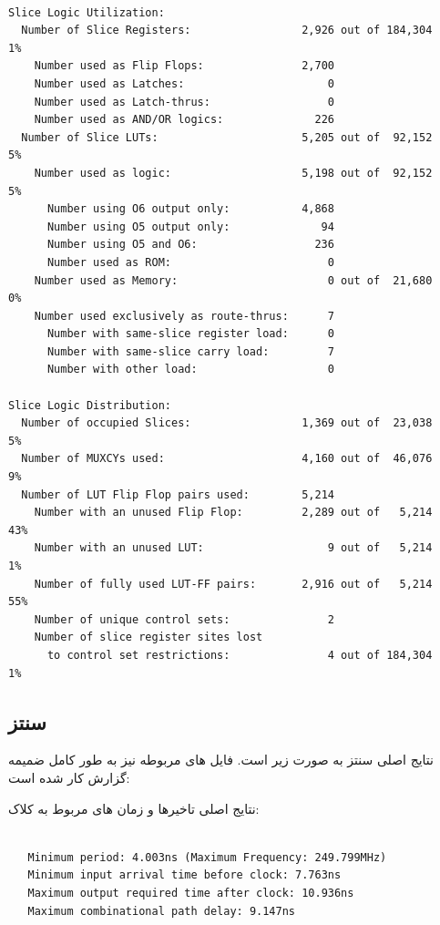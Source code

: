 \documentclass[12pt,titlepage,a4page , tikz , multi,table , svgnames,xcdraw]{article}
\begin{document}
\begin{latin}
\begin{verbatim}

Slice Logic Utilization:
  Number of Slice Registers:                 2,926 out of 184,304    1%
    Number used as Flip Flops:               2,700
    Number used as Latches:                      0
    Number used as Latch-thrus:                  0
    Number used as AND/OR logics:              226
  Number of Slice LUTs:                      5,205 out of  92,152    5%
    Number used as logic:                    5,198 out of  92,152    5%
      Number using O6 output only:           4,868
      Number using O5 output only:              94
      Number using O5 and O6:                  236
      Number used as ROM:                        0
    Number used as Memory:                       0 out of  21,680    0%
    Number used exclusively as route-thrus:      7
      Number with same-slice register load:      0
      Number with same-slice carry load:         7
      Number with other load:                    0

Slice Logic Distribution:
  Number of occupied Slices:                 1,369 out of  23,038    5%
  Number of MUXCYs used:                     4,160 out of  46,076    9%
  Number of LUT Flip Flop pairs used:        5,214
    Number with an unused Flip Flop:         2,289 out of   5,214   43%
    Number with an unused LUT:                   9 out of   5,214    1%
    Number of fully used LUT-FF pairs:       2,916 out of   5,214   55%
    Number of unique control sets:               2
    Number of slice register sites lost
      to control set restrictions:               4 out of 184,304    1%

\end{verbatim}
\end{latin}

\subsection{سنتز }

نتایج اصلی سنتز به صورت زیر است. فایل های مربوطه نیز به طور کامل ضمیمه گزارش کار شده است:

نتایج اصلی تاخیرها و زمان های مربوط به کلاک:

\begin{latin}
\begin{verbatim}

   Minimum period: 4.003ns (Maximum Frequency: 249.799MHz)
   Minimum input arrival time before clock: 7.763ns
   Maximum output required time after clock: 10.936ns
   Maximum combinational path delay: 9.147ns


\end{verbatim}
\end{latin}
\end{document}
